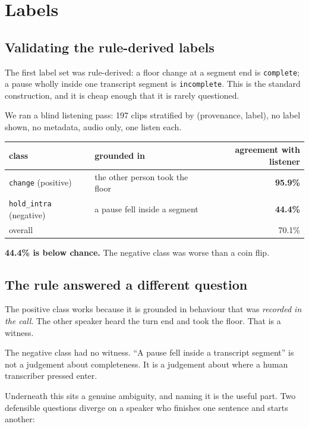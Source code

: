 \documentclass[11pt]{article}
\newcommand{\pct}{\%}
\begin{document}
\section{Labels}
\label{sec:labels}

\subsection{Validating the rule-derived labels}

The first label set was rule-derived: a floor change at a segment end is
\texttt{complete}; a pause wholly inside one transcript segment is
\texttt{incomplete}. This is the standard construction, and it is cheap enough
that it is rarely questioned.

We ran a blind listening pass: 197 clips stratified by (provenance, label), no
label shown, no metadata, audio only, one listen each.

\begin{center}
\small
\begin{tabular}{llr}
\toprule
class & grounded in & agreement with listener \\
\midrule
\texttt{change} (positive) & the other person took the floor & \textbf{95.9\pct} \\
\texttt{hold\_intra} (negative) & a pause fell inside a segment & \textbf{44.4\pct} \\
overall & & 70.1\pct \\
\bottomrule
\end{tabular}
\end{center}

\textbf{44.4\pct{} is below chance.} The negative class was worse than a coin
flip.

\subsection{The rule answered a different question}

The positive class works because it is grounded in behaviour that was
\emph{recorded in the call}. The other speaker heard the turn end and took the
floor. That is a witness.

The negative class had no witness. ``A pause fell inside a transcript segment''
is not a judgement about completeness. It is a judgement about where a human
transcriber pressed enter.

Underneath this sits a genuine ambiguity, and naming it is the useful part.
Two defensible questions diverge on a speaker who finishes one sentence and
starts another:
\end{document}

